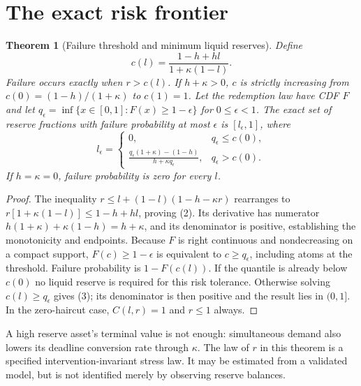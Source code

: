 \documentclass[11pt]{article}
\newtheorem{theorem}{Theorem}
\theoremstyle{remark}
\begin{document}
\section{The exact risk frontier}
\begin{theorem}[Failure threshold and minimum liquid reserves]
Define
\[
 c(l)=\frac{1-h+hl}{1+\kappa(1-l)}.                               \tag{2}
\]
Failure occurs exactly when $r>c(l)$. If $h+\kappa>0$, $c$ is strictly
increasing from $c(0)=(1-h)/(1+\kappa)$ to $c(1)=1$.
Let the redemption law have CDF $F$ and let
$q_\epsilon=\inf\{x\in[0,1]:F(x)\geq1-\epsilon\}$ for
$0\leq\epsilon<1$. The exact set of reserve fractions with failure
probability at most $\epsilon$ is $[l_\epsilon,1]$, where
\[
 l_\epsilon=\begin{cases}
 0,&q_\epsilon\leq c(0),\\[2pt]
 \displaystyle\frac{q_\epsilon(1+\kappa)-(1-h)}{h+\kappa q_\epsilon},
       &q_\epsilon>c(0).
 \end{cases}                                                     \tag{3}
\]
If $h=\kappa=0$, failure probability is zero for every $l$.
\end{theorem}
\begin{proof}
The inequality $r\leq l+(1-l)(1-h-\kappa r)$ rearranges to
$r[1+\kappa(1-l)]\leq1-h+hl$, proving (2). Its derivative has
numerator $h(1+\kappa)+\kappa(1-h)=h+\kappa$, and its denominator
is positive, establishing the monotonicity and endpoints.
Because $F$ is right continuous and nondecreasing on a compact support,
$F(c)\geq1-\epsilon$ is equivalent to $c\geq q_\epsilon$, including
atoms at the threshold. Failure probability is $1-F(c(l))$.
If the quantile is already below $c(0)$ no liquid reserve is required
for this risk tolerance. Otherwise solving $c(l)\geq q_\epsilon$
gives (3); its denominator is then positive and the result lies in
$(0,1]$. In the zero-haircut case, $C(l,r)=1$ and $r\leq1$ always.
\end{proof}
A high reserve asset's terminal value is not enough: simultaneous demand
also lowers its deadline conversion rate through $\kappa$. The law of
$r$ in this theorem is a specified intervention-invariant stress law. It
may be estimated from a validated model, but is not identified merely by
observing reserve balances.
\end{document}
